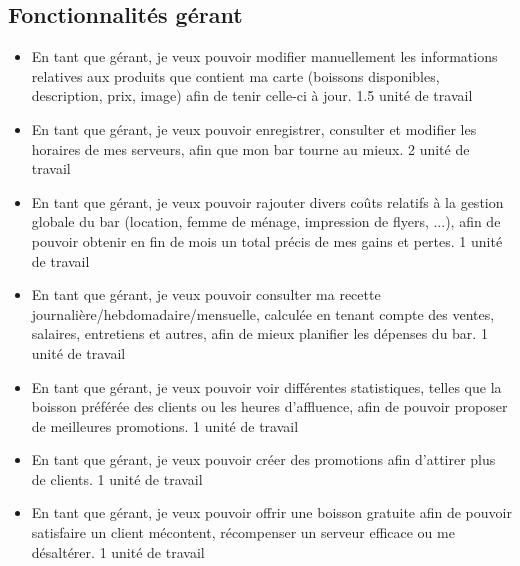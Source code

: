 \documentclass[11pt,a4paper]{article}
\begin{document}
\begin{spacing}{1.1}
\subsection{Fonctionnalités gérant}
\begin{itemize}[label=\textbullet,font=\color{cyan}]
\item En tant que gérant, je veux pouvoir modifier manuellement les informations relatives aux produits que contient ma carte (boissons disponibles, description, prix, image) afin de tenir celle-ci à jour.
{\color{cyan} 1.5 unité de travail}

\item En tant que gérant, je veux pouvoir enregistrer, consulter et modifier les horaires de mes serveurs, afin que mon bar tourne au mieux.
{\color{cyan} 2 unité de travail}

\item En tant que gérant, je veux pouvoir rajouter divers coûts relatifs à la gestion globale du bar (location, femme de ménage, impression de flyers, ...), afin de pouvoir obtenir en fin de mois un total précis de mes gains et pertes.
{\color{cyan} 1 unité de travail}

\item En tant que gérant, je veux pouvoir consulter ma recette journalière/hebdomadaire/mensuelle, calculée en tenant compte des ventes, salaires, entretiens et autres, afin de mieux planifier les dépenses du bar.
{\color{cyan} 1 unité de travail}

\item En tant que gérant, je veux pouvoir voir différentes statistiques, telles que la boisson préférée des clients ou les heures d'affluence, afin de pouvoir proposer de meilleures promotions.
{\color{cyan} 1 unité de travail}

\item En tant que gérant, je veux pouvoir créer des promotions afin d'attirer plus de clients.
{\color{cyan} 1 unité de travail}

\item En tant que gérant, je veux pouvoir offrir une boisson gratuite afin de pouvoir satisfaire un client mécontent, récompenser un serveur efficace ou me désaltérer.
{\color{cyan} 1 unité de travail}
\end{itemize}


\end{spacing}
\end{document}
